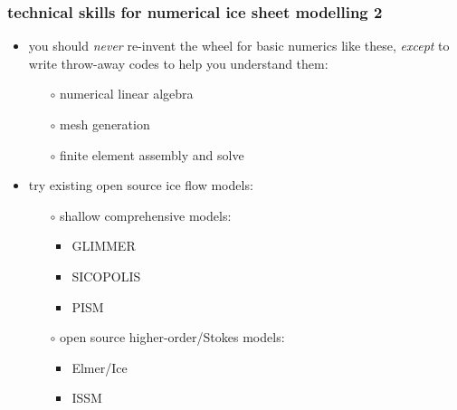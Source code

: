 \begin{frame}
\frametitle{technical skills for numerical ice sheet modelling 2}

\begin{itemize}
\item you should \emph{never} re-invent the wheel for basic numerics like these, \emph{except} to write throw-away codes to help you understand them:
  \begin{itemize}
  \item[$\circ$] numerical linear algebra
  \item[$\circ$] mesh generation
  \item[$\circ$] finite element assembly and solve
  \end{itemize}
\item try existing open source ice flow models:
  \begin{itemize}
  \item[$\circ$] shallow comprehensive models:
    \begin{itemize}
    \item GLIMMER
    \item SICOPOLIS
    \item PISM
    \end{itemize}
  \item[$\circ$] open source higher-order/Stokes models:
    \begin{itemize}
    \item Elmer/Ice
    \item ISSM
    \end{itemize}
  \end{itemize}
\end{itemize}
\end{frame}